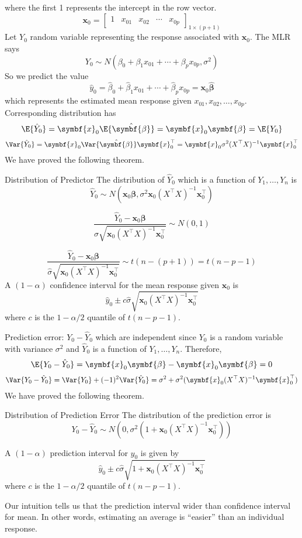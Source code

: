 where the first 1 represents the intercept in the row vector.
\[ \symbf{x}_0=\begin{bmatrix}
        1 & x_{01} & x_{02} & \cdots & x_{0p}
    \end{bmatrix}_{1\times (p+1)} \]
Let $ Y_0 $ random variable representing the response
associated with $ \symbf{x}_0 $. The MLR says
\[ Y_0 \sim N(\beta_0+\beta_1x_{01}+\cdots+\beta_p x_{0p},\sigma^2) \]
So we predict the value
\[ \hat{y}_0=\hat{\beta}_0+\hat{\beta}_1x_{01}+\cdots+
    \hat{\beta}_p x_{0p}=\symbf{x}_0\hat{\symbf{\beta}} \]
which represents the estimated mean response given
$ x_{01},x_{02},\ldots,x_{0p} $. Corresponding distribution
has
\[ \E{\hat{Y}_0}=\symbf{x}_0\E{\hat{\symbf{\beta}}}=\symbf{x}_0\symbf{\beta}
    =\E{Y_0} \]
\[ \Var{\hat{Y}_0}=\symbf{x}_0\Var{\hat{\symbf{\beta}}}\symbf{x}_0^\top=
    \symbf{x}_0\sigma^2(X^\top X)^{-1}\symbf{x}_0^\top \]
We have proved the following theorem.
\begin{Theorem}{Distribution of Predictor}{}
    The distribution of $ \hat{Y}_0 $ which is a function
    of $ Y_1,\ldots,Y_n $ is
    \[ \hat{Y}_0 \sim N(\symbf{x}_0\symbf{\beta},\sigma^2\symbf{x}_0(X^\top X)^{-1}
        \symbf{x}_0^\top) \]
\end{Theorem}
\[ \frac{\hat{Y}_0-\symbf{x}_0\symbf{\beta}}{\sigma\sqrt{
            \symbf{x}_0(X^\top X)^{-1}\symbf{x}_0^\top
        }}\sim N(0,1)  \]

\[ \frac{\hat{Y}_0-\symbf{x}_0\symbf{\beta}}{\hat{\sigma}\sqrt{
            \symbf{x}_0(X^\top X)^{-1}\symbf{x}_0^\top
        }}\sim t(n-(p+1))=t(n-p-1)  \]
A $ (1-\alpha) $ confidence interval for the mean
response given $ \symbf{x}_0 $ is
\[ \hat{y}_0\pm c \hat{\sigma}\sqrt{
        \symbf{x}_0(X^\top X)^{-1}\symbf{x}_0^\top} \]
where $ c $ is the $ 1-\alpha/2 $ quantile of $ t(n-p-1) $.

Prediction error: $ Y_0-\hat{Y}_0 $ which are independent
since $ Y_0 $ is a random variable with variance $ \sigma^2 $
and $ \hat{Y}_0 $ is a function of $ Y_1,\ldots,Y_n $. Therefore,
\[ \E{Y_0-\hat{Y}_0}=\symbf{x}_0\symbf{\beta}-\symbf{x}_0\symbf{\beta}=0 \]
\[ \Var{Y_0-\hat{Y}_0}=\Var{Y_0}+(-1)^2\Var{\hat{Y}_0}=
    \sigma^2+\sigma^2(\symbf{x}_0(X^\top X)^{-1}\symbf{x}_0^\top) \]
We have proved the following theorem.
\begin{Theorem}{Distribution of Prediction Error}{}
    The distribution of the prediction error is
    \[ Y_0-\hat{Y}_0 \sim N(
        0,\sigma^2(1+\symbf{x}_0(X^\top X)^{-1}\symbf{x}_0^\top)
        ) \]
\end{Theorem}

A $ (1-\alpha) $ prediction interval for $ y_0 $ is given by
\[ \hat{y}_0\pm c\hat{\sigma}\sqrt{1+\symbf{x}_0(X^\top X)^{-1}\symbf{x}_0^\top} \]
where $ c $ is the $ 1-\alpha/2 $ quantile of $ t(n-p-1) $.

\begin{Remark}{}{}
    Our intuition tells us that the prediction interval wider than
    confidence interval for mean. In other words, estimating
    an average is ``easier'' than an individual response.
\end{Remark}

